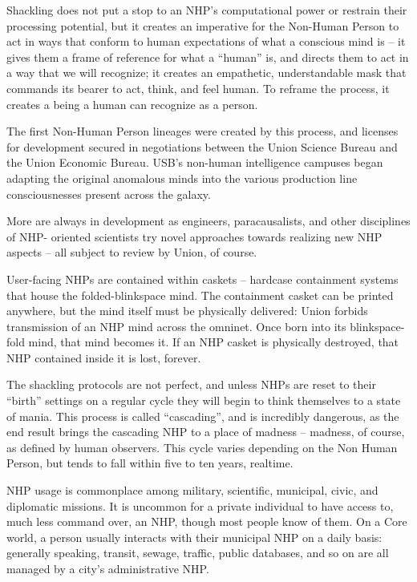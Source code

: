 Shackling does not put a stop to an NHP’s computational power or restrain their processing
potential, but it creates an imperative for the Non-Human Person to act in ways that conform to
human expectations of what a conscious mind is -- it gives them a frame of reference for what a
“human” is, and directs them to act in a way that we will recognize; it creates an empathetic,
understandable mask that commands its bearer to act, think, and feel human. To reframe the
process, it creates a being a human can recognize as a person.


The first Non-Human Person lineages were created by this process, and licenses for
development secured in negotiations between the Union Science Bureau and the Union
Economic Bureau. USB’s non-human intelligence campuses began adapting the original
anomalous minds into the various production line consciousnesses present across the galaxy.


More are always in development as engineers, paracausalists, and other disciplines of NHP-
oriented scientists try novel approaches towards realizing new NHP aspects -- all subject to
review by Union, of course.


User-facing NHPs are contained within caskets -- hardcase containment systems that house the
folded-blinkspace mind. The containment casket can be printed anywhere, but the mind itself
must be physically delivered: Union forbids transmission of an NHP mind across the omninet.
Once born into its blinkspace-fold mind, that mind becomes it. If an NHP casket is physically
destroyed, that NHP contained inside it is lost, forever.





The shackling protocols are not perfect, and unless NHPs are reset to their “birth” settings on a
regular cycle they will begin to think themselves to a state of mania. This process is called
“cascading”, and is incredibly dangerous, as the end result brings the cascading NHP to a place
of madness -- madness, of course, as defined by human observers. This cycle varies depending
on the Non Human Person, but tends to fall within five to ten years, realtime.


NHP usage is commonplace among military, scientific, municipal, civic, and diplomatic missions.
It is uncommon for a private individual to have access to, much less command over, an NHP,
though most people know of them. On a Core world, a person usually interacts with their
municipal NHP on a daily basis: generally speaking, transit, sewage, traffic, public databases,
and so on are all managed by a city’s administrative NHP.

